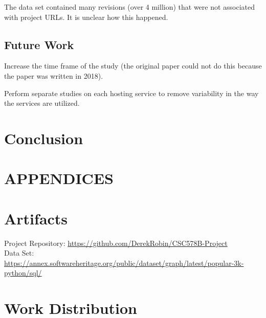 \documentclass[acmconf]{acmart}
\begin{document}
The data set contained many revisions (over 4 million) that were not associated with project URLs.
It is unclear how this happened.


\subsection{Future Work} \label{future}


Increase the time frame of the study (the original paper could not do this because the paper was written in 2018).

Perform separate studies on each hosting service to remove variability in the way the services are utilized.

\section{Conclusion} \label{conclusion}




\appendix
\section*{APPENDICES}
\section{Artifacts} \label{artifacts}

Project Repository: \url{https://github.com/DerekRobin/CSC578B-Project}\\
Data Set: \url{https://annex.softwareheritage.org/public/dataset/graph/latest/popular-3k-python/sql/}

\section{Work Distribution}
\end{document}
